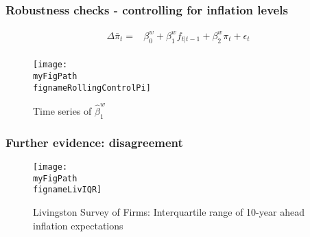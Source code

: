 \documentclass[10pt]{beamer}
\def \myFigPath {../../../figures/}
\def\fignameRollingControlPi{rolling_overlapping_pi_controls_pilevel_command_anchoring_in_data_individual_20_Oct_2020_11_42_26}
\def\fignameRollingControlPiIQR{rolling_overlapping_pi_controls_pilevel_iqrcommand_anchoring_in_data_individual_20_Oct_2020_11_42_26}
\def\fignameLivIQR{Livingston_IQR_command_anchoring_in_data_14_Sep_2020_18_12_59}
\begin{document}
\begin{frame}[plain]  %
\frametitle{Robustness checks - controlling for inflation levels}

\begin{align*}
\Delta\bar{\pi}_t = & \beta^w_0 + \beta^w_1f_{t|t-1} + \beta^w_2 \pi_t + \epsilon_t \tag{1} \\
\end{align*}

\vspace{-0.7cm}

\begin{figure}[h!]
\texttt{[image: \\myFigPath \\fignameRollingControlPi]}
\caption{Time series of $\hat{\beta}_1^w$}
\label{rollingPi}
\end{figure}


\vfill
\vspace{-0.9cm}

\hyperlink{rolling}{}	\end{frame}

%
%
%
%
%
%



\begin{frame}[plain]  %
	\frametitle{Further evidence: disagreement}


\begin{figure}[h!]
\caption{Livingston Survey of Firms: \newline Interquartile range of 10-year ahead inflation expectations}
\texttt{[image: \\myFigPath \\fignameLivIQR]}
\label{LivIQR}
\end{figure}

\vfill 
\hyperlink{rolling}{}	

\end{frame}
\end{document}
